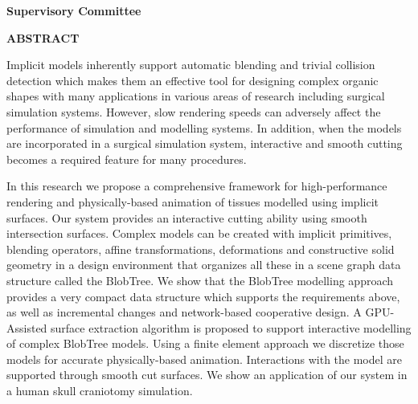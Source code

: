 \pagebreak
\newpage
{}

\noindent \textbf{Supervisory Committee}
\tpbreak
\panel

\begin{center}
\textbf{ABSTRACT}
\end{center}
Implicit models inherently support automatic blending and trivial collision detection 
which makes them an effective tool for designing complex organic shapes with many applications in 
various areas of research including surgical simulation systems. However, slow rendering speeds can 
adversely affect the performance of simulation and modelling systems. In addition, when the models are 
incorporated in a surgical simulation system, interactive and smooth cutting becomes a required feature 
for many procedures.

In this research we propose a comprehensive framework for high-performance rendering
and physically-based animation of tissues modelled using implicit surfaces.
Our system provides an interactive cutting ability using smooth intersection surfaces.
Complex models can be created with implicit primitives, blending operators, affine
transformations, deformations and constructive solid geometry in a design environment that organizes
all these in a scene graph data structure called the BlobTree. We show that the
BlobTree modelling approach provides a very compact data structure which supports 
the requirements above, as well as incremental changes and network-based cooperative design.
A GPU-Assisted surface extraction algorithm is proposed to support interactive modelling of complex BlobTree models.
Using a finite element approach we discretize those models for accurate physically-based animation. 
Interactions with the model are supported through smooth cut surfaces. We show an application of our
system in a human skull craniotomy simulation.


\pagebreak


